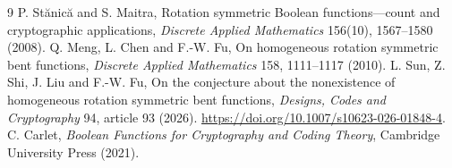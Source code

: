 \documentclass[11pt,a4paper]{article}
\begin{document}
\begin{thebibliography}{9}
 P. St\u{a}nic\u{a} and S. Maitra,
Rotation symmetric Boolean functions---count and cryptographic applications,
\emph{Discrete Applied Mathematics} 156(10), 1567--1580 (2008).
 Q. Meng, L. Chen and F.-W. Fu,
On homogeneous rotation symmetric bent functions,
\emph{Discrete Applied Mathematics} 158, 1111--1117 (2010).
 L. Sun, Z. Shi, J. Liu and F.-W. Fu,
On the conjecture about the nonexistence of homogeneous rotation symmetric
bent functions, \emph{Designs, Codes and Cryptography} 94, article 93 (2026).
\url{https://doi.org/10.1007/s10623-026-01848-4}.
 C. Carlet, \emph{Boolean Functions for Cryptography and
Coding Theory}, Cambridge University Press (2021).
\end{thebibliography}
\end{document}
